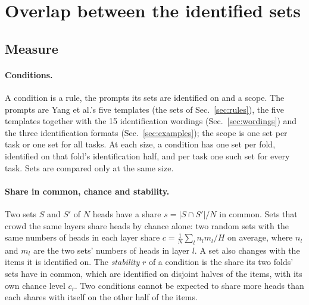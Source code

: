 \documentclass[10pt,a4paper]{article}
\begin{document}
\begin{table}[tbp]
\centering\footnotesize\setlength{\tabcolsep}{4pt}

\caption{Unseen tasks: the shared 40-head sets identified on the 14 tasks, patched with each unseen task's own means; accuracy on the test half, mean of the two folds. No patch: the patched items without a patch. Most common answer: the share of the patched items whose answer is the most frequent one (actor; baseball or hockey; piano). Mean, Control (the related task's means) and Random (random sets with as many heads in each layer, three draws): means over the four unseen tasks. 14 tasks: the same set on the tasks it was identified on, at the same fixed $\alpha$, which differs slightly from the cross-fitted values of Table~\ref{tab:ladder-acc}. DBTPL is the other combination that does better than Combined on the unseen tasks at both scalings; the other five are in Table~\ref{tab:unseen-combos}.}
\label{tab:unseen}
\end{table}

\section{Overlap between the identified sets}\label{sec:overlap}

\subsection{Measure}\label{sec:overlap-measure}

\paragraph{Conditions.} A condition is a rule, the prompts its sets are identified on and a scope. The prompts are Yang et al.'s five templates (the sets of Sec.~\ref{sec:rules}), the five templates together with the 15 identification wordings (Sec.~\ref{sec:wordings}) and the three identification formats (Sec.~\ref{sec:examples}); the scope is one set per task or one set for all tasks. At each size, a condition has one set per fold, identified on that fold's identification half, and per task one such set for every task. Sets are compared only at the same size.

\paragraph{Share in common, chance and stability.} Two sets $S$ and $S'$ of $N$ heads have a share $s=|S\cap S'|/N$ in common. Sets that crowd the same layers share heads by chance alone: two random sets with the same numbers of heads in each layer share $c=\frac{1}{N}\sum_l n_l m_l/H$ on average, where $n_l$ and $m_l$ are the two sets' numbers of heads in layer $l$. A set also changes with the items it is identified on. The \emph{stability} $r$ of a condition is the share its two folds' sets have in common, which are identified on disjoint halves of the items, with its own chance level $c_r$. Two conditions cannot be expected to share more heads than each shares with itself on the other half of the items.
\end{document}
